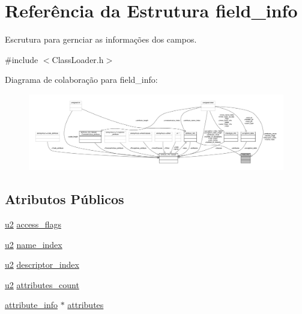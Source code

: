 \hypertarget{structfield__info}{}\section{Referência da Estrutura field\+\_\+info}
\label{structfield__info}


Escrutura para gernciar as informações dos campos.  




{\ttfamily \#include $<$Class\+Loader.\+h$>$}



Diagrama de colaboração para field\+\_\+info\+:\nopagebreak
\begin{figure}[H]
\begin{center}
\leavevmode
\includegraphics[width=350pt]{structfield__info__coll__graph}
\end{center}
\end{figure}
\subsection*{Atributos Públicos}
\begin{DoxyCompactItemize}
\item 
\hyperlink{ClassLoader_8h_a5f223212eef04d10a4550ded680cb1cf}{u2} \hyperlink{structfield__info_aa622dc9a5b5353d2f3eb2f416dacab4b}{access\+\_\+flags}
\item 
\hyperlink{ClassLoader_8h_a5f223212eef04d10a4550ded680cb1cf}{u2} \hyperlink{structfield__info_a425e3ae85badd81c67ef00acca85ad9e}{name\+\_\+index}
\item 
\hyperlink{ClassLoader_8h_a5f223212eef04d10a4550ded680cb1cf}{u2} \hyperlink{structfield__info_a12dd492b7fb1d61da1ac14938d97b07f}{descriptor\+\_\+index}
\item 
\hyperlink{ClassLoader_8h_a5f223212eef04d10a4550ded680cb1cf}{u2} \hyperlink{structfield__info_a83bfa4ff84a608e3dbd1c3968ebe1b80}{attributes\+\_\+count}
\item 
\hyperlink{structattribute__info}{attribute\+\_\+info} $\ast$ \hyperlink{structfield__info_afdda114944ae5eaae78c237f99257108}{attributes}
\end{DoxyCompactItemize}


